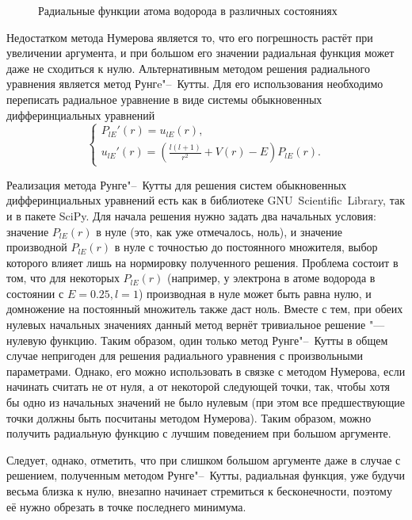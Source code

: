 \begin{figure}[ht]
    \caption{Радиальные функции атома водорода в различных состояниях}\label{fig:radial-functions}
\end{figure}

Недостатком метода Нумерова является то, что его погрешность растёт при увеличении аргумента, и при большом его значении
радиальная функция может даже не сходиться к нулю. Альтернативным методом решения радиального уравнения является метод
Рунгe"--~Кутты. Для его использования необходимо переписать радиальное уравнение в виде системы обыкновенных
дифферинциальных уравнений
\begin{equation}\label{eq:RungeKuttaSolvableSystem}
  \begin{cases}
    P_{l E}'(r) = u_{l E}(r),\\
    u_{l E}'(r) = \left( \frac{l \left(l + 1 \right)}{r^2} + V(r) - E \right) P_{l E}(r).
  \end{cases}
\end{equation}

Реализация метода Рунге"--~Кутты для решения систем обыкновенных дифферинциальных уравнений есть как в библиотеке
GNU~Scientific~Library\cite{rk-gsl}, так
и в пакете SciPy\cite{rk-scipy}. Для начала решения нужно задать два начальных условия: значение $P_{l E}(r)$ в
нуле (это, как уже отмечалось, ноль), и значение производной $P_{l E}(r)$ в нуле с точностью до постоянного
множителя, выбор которого влияет лишь на нормировку полученного решения. Проблема состоит в том, что для некоторых
$P_{l E}(r)$ (например, у электрона в атоме водорода в состоянии с $E = 0.25, l = 1$) производная в нуле может быть равна
нулю, и домножение на постоянный множитель также даст ноль. Вместе с тем, при обеих нулевых начальных значениях данный
метод вернёт тривиальное решение "---нулевую функцию. Таким образом, один только метод Рунге"--~Кутты в общем случае непригоден для
решения радиального уравнения с произвольными параметрами. Однако, его можно использовать в связке с методом Нумерова,
если начинать считать не от нуля, а от некоторой следующей точки, так, чтобы хотя бы одно из начальных значений не было
нулевым (при этом все предшествующие точки должны быть посчитаны методом Нумерова). Таким образом, можно получить
радиальную функцию с лучшим поведением при большом аргументе.

Следует, однако, отметить, что при слишком большом аргументе даже в случае с решением, полученным методом Рунге"--~Кутты,
радиальная функция, уже будучи весьма близка к нулю, внезапно начинает стремиться к бесконечности, поэтому её нужно
обрезать в точке последнего минимума.

\FloatBarrier
